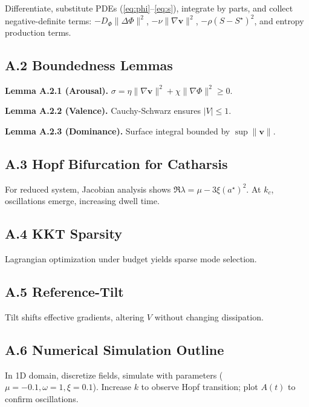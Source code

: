 \documentclass[11pt]{article}
\theoremstyle{plain}
\begin{document}
Differentiate, substitute PDEs (\ref{eq:phi}–\ref{eq:s}), integrate by parts, and collect negative-definite terms: \(-D_\Phi \|\Delta \Phi\|^2\), \(- \nu \|\nabla \mathbf{v}\|^2\), \(- \rho (S - S^\star)^2\), and entropy production terms.

\subsection{A.2 Boundedness Lemmas}

\textbf{Lemma A.2.1 (Arousal).} \(\sigma = \eta \|\nabla \mathbf{v}\|^2 + \chi \|\nabla \Phi\|^2 \geq 0\).

\textbf{Lemma A.2.2 (Valence).} Cauchy-Schwarz ensures \(|V| \leq 1\).

\textbf{Lemma A.2.3 (Dominance).} Surface integral bounded by \(\sup \|\mathbf{v}\|\).

\subsection{A.3 Hopf Bifurcation for Catharsis}

For reduced system, Jacobian analysis shows \(\Re \lambda = \mu - 3\xi (a^\star)^2\). At \(k_c\), oscillations emerge, increasing dwell time.

\subsection{A.4 KKT Sparsity}

Lagrangian optimization under budget yields sparse mode selection.

\subsection{A.5 Reference-Tilt}

Tilt shifts effective gradients, altering \(V\) without changing dissipation.

\subsection{A.6 Numerical Simulation Outline}

In 1D domain, discretize fields, simulate with parameters (\(\mu = -0.1, \omega = 1, \xi = 0.1\)). Increase \(k\) to observe Hopf transition; plot \(A(t)\) to confirm oscillations.

\newpage


\end{document}
